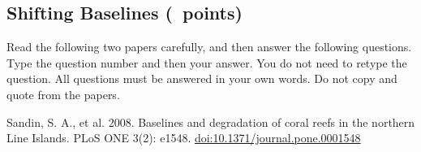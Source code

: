 \documentclass[11pt, addpoints]{exam}
\begin{document}
\subsection*{Shifting Baselines (\numpoints\ points)}

Read the following two papers carefully, and then answer the following questions. Type the question number and then your answer. You do not need to retype the question. All questions must be answered in your own words. Do not copy and quote from the papers. \vspace{\baselineskip}

\begin{hangparas}{1.5em}{1}
Sandin, S. A., et al. 2008. Baselines and degradation of coral reefs in the northern Line Islands. PLoS ONE 3(2): e1548. \href{http://journals.plos.org/plosone/article?id=10.1371/journal.pone.0001548}{doi:10.1371/journal.pone.0001548}\vspace{\baselineskip}

\end{hangparas}
\end{document}
